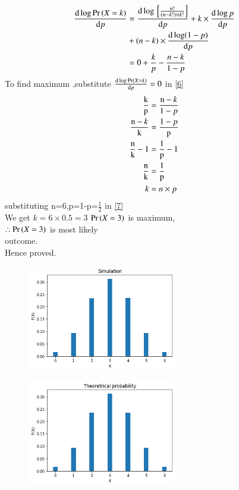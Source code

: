 \documentclass[journal,12pt,twocolumn]{IEEEtran}
\begin{document}
\begin{align}
\frac{\mathrm{d} \log \Pr\left(X=k\right) }{\mathrm{d} p}&=\frac{\mathrm{d} \log {}\left[\frac{n!}{(n-k!)\times k!}\right]}{\mathrm{d}p}+k\times  \frac{\mathrm{d}\log p}{\mathrm{d} p} \\
     &+(n-k) \times \frac{\mathrm{d}\log (1-p)}{\mathrm{d} p} \notag \\
     &=0+\frac{k}{p}-\frac{n-k}{1-p} \label{6}
\end{align}
To find maximum ,substitute $\frac{\mathrm{d} \log  \Pr\left(X=k\right) }{\mathrm{d} p}=0$ in \eqref{6}
\begin{align}
\frac{\mbox k}{\mbox p}&=\frac{\mbox n-k}{\mbox 1-p}  \\
\frac{\mbox n-k}{\mbox k}&=\frac{\mbox 1-p}{\mbox p}  \\
\frac{\mbox n}{\mbox k}-1&=\frac{\mbox 1}{\mbox p}-1  \\
\frac{\mbox n}{\mbox k}&=\frac{\mbox 1}{\mbox p}  \\
k&=n\times p \label{7}
\end{align}
substituting n=6,p=1-p=$\frac{1}{2}$ in \eqref{7}\\
We get $k=6\times 0.5=3$
$\Pr\left(X=3\right)$ is maximum,\\
$\therefore\Pr\left(X=3\right)$ is most likely \\
outcome.\\
Hence proved.

\begin{figure}
\begin{center}
\includegraphics[width=0.58\textwidth]{assignment1.png}
\end{center}
\end{figure}
\begin{figure}
\begin{center}
\includegraphics[width=0.58\textwidth]{assignment-1.png}
\end{center}
\end{figure}
\end{document}
